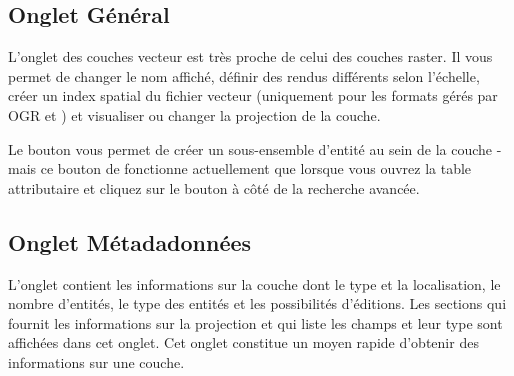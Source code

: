 \subsection{Onglet Général}\label{vectorgeneraltab}
L'onglet  des couches vecteur est très proche de celui des couches raster. Il vous permet de changer le nom affiché, définir des rendus différents selon l'échelle, créer un index spatial du fichier vecteur (uniquement pour les formats gérés par OGR et \pg) et visualiser ou changer la projection de la couche.

Le bouton  vous permet de créer un sous-ensemble d'entité au sein de la couche - mais ce bouton de fonctionne actuellement que lorsque vous ouvrez la table attributaire et cliquez sur le bouton \button{\dots} à côté de la recherche avancée.

\subsection{Onglet Métadadonnées}

L'onglet  contient les informations sur la couche dont le type et la localisation, le nombre d'entités, le type des entités et les possibilités d'éditions. Les sections  qui fournit les informations sur la projection et  qui liste les champs et leur type sont affichées dans cet onglet. Cet onglet constitue un moyen rapide d'obtenir des informations sur une couche.

